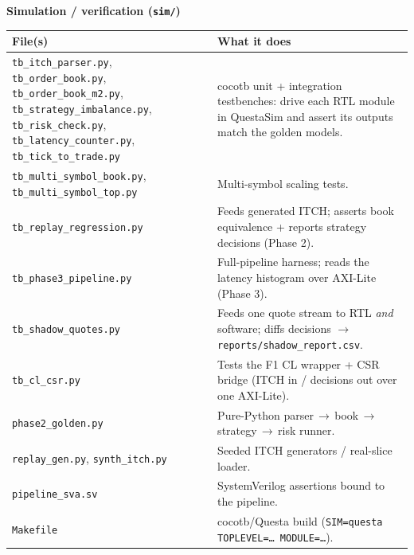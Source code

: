 \documentclass[10pt,a4paper]{article}
\newcommand{\fpath}[1]{\texttt{\textcolor{hdrblue}{#1}}}
\begin{document}
{\bfseries\color{hdrblue} Simulation / verification (\fpath{sim/})}
\vspace{2pt}
\begin{center}\small
\renewcommand{\arraystretch}{1.25}
\begin{tabularx}{\linewidth}{@{}>{\raggedright\arraybackslash}p{5.4cm} X@{}}
\toprule
\textbf{File(s)} & \textbf{What it does} \\
\midrule
\fpath{tb\_itch\_parser.py}, \fpath{tb\_order\_book.py}, \fpath{tb\_order\_book\_m2.py}, \fpath{tb\_strategy\_imbalance.py}, \fpath{tb\_risk\_check.py}, \fpath{tb\_latency\_counter.py}, \fpath{tb\_tick\_to\_trade.py} & cocotb unit + integration testbenches: drive each RTL module in QuestaSim and assert its outputs match the golden models. \\
\fpath{tb\_multi\_symbol\_book.py}, \fpath{tb\_multi\_symbol\_top.py} & Multi-symbol scaling tests. \\
\fpath{tb\_replay\_regression.py} & Feeds generated ITCH; asserts book equivalence + reports strategy decisions (Phase 2). \\
\fpath{tb\_phase3\_pipeline.py} & Full-pipeline harness; reads the latency histogram over AXI-Lite (Phase 3). \\
\fpath{tb\_shadow\_quotes.py} & Feeds one quote stream to RTL \emph{and} software; diffs decisions $\to$ \fpath{reports/shadow\_report.csv}. \\
\fpath{tb\_cl\_csr.py} & Tests the F1 CL wrapper + CSR bridge (ITCH in / decisions out over one AXI-Lite). \\
\fpath{phase2\_golden.py} & Pure-Python parser\,$\to$\,book\,$\to$\,strategy\,$\to$\,risk runner. \\
\fpath{replay\_gen.py}, \fpath{synth\_itch.py} & Seeded ITCH generators / real-slice loader. \\
\fpath{pipeline\_sva.sv} & SystemVerilog assertions bound to the pipeline. \\
\fpath{Makefile} & cocotb/Questa build (\texttt{SIM=questa TOPLEVEL=\dots\ MODULE=\dots}). \\
\bottomrule
\end{tabularx}
\end{center}
\end{document}
